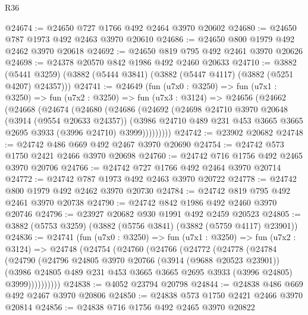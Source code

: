 \begin{lexlean}{R36}
\begin{coremodule}
@24674 := @24650 @727 @1766 @492 @2464 @3970 @20602
@24680 := @24650 @787 @1973 @492 @2463 @3970 @20610
@24686 := @24650 @800 @1979 @492 @2462 @3970 @20618
@24692 := @24650 @819 @795 @492 @2461 @3970 @20626
@24698 := @24378 @20570 @842 @1986 @492 @2460 @20633
@24710 := @3882
    (@5441 @3259)
    (@3882 (@5444 @3841) (@3882 (@5447 @4117) (@3882 (@5251 @4207) @24357)))
@24741 := @24649
    (fun (u7x0 : @3250) =>
    fun (u7x1 : @3250) =>
    fun (u7x2 : @3250) =>
    fun (u7x3 : @3124) =>
    @24656
      (@24662
        (@24668
          (@24674
            (@24680
              (@24686
                (@24692
                  (@24698
                    @24710
                    @3970
                    @20648
                    (@3914 (@9554 @20633 @24357))
                    (@3986
                      @24710
                      @489
                      @231
                      @453
                      @3665
                      @3665
                      @2695
                      @3933
                      (@3996 @24710)
                      @3999)))))))))
@24742 := @23902 @20682
@24748 := @24742 @486 @669 @492 @2467 @3970 @20690
@24754 := @24742 @573 @1750 @2421 @2466 @3970 @20698
@24760 := @24742 @716 @1756 @492 @2465 @3970 @20706
@24766 := @24742 @727 @1766 @492 @2464 @3970 @20714
@24772 := @24742 @787 @1973 @492 @2463 @3970 @20722
@24778 := @24742 @800 @1979 @492 @2462 @3970 @20730
@24784 := @24742 @819 @795 @492 @2461 @3970 @20738
@24790 := @24742 @842 @1986 @492 @2460 @3970 @20746
@24796 := @23927 @20682 @930 @1991 @492 @2459 @20523
@24805 := @3882 (@5753 @3259) (@3882 (@5756 @3841) (@3882 (@5759 @4117) @23901))
@24836 := @24741
    (fun (u7x0 : @3250) =>
    fun (u7x1 : @3250) =>
    fun (u7x2 : @3124) =>
    @24748
      (@24754
        (@24760
          (@24766
            (@24772
              (@24778
                (@24784
                  (@24790
                    (@24796
                      @24805
                      @3970
                      @20766
                      (@3914 (@9688 @20523 @23901))
                      (@3986
                        @24805
                        @489
                        @231
                        @453
                        @3665
                        @3665
                        @2695
                        @3933
                        (@3996 @24805)
                        @3999))))))))))
@24838 := @4052 @23794 @20798
@24844 := @24838 @486 @669 @492 @2467 @3970 @20806
@24850 := @24838 @573 @1750 @2421 @2466 @3970 @20814
@24856 := @24838 @716 @1756 @492 @2465 @3970 @20822

\end{coremodule}
\end{lexlean}
